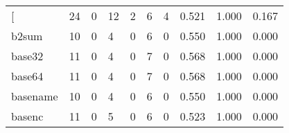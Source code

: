 \begin{longtable}{lp{1.3cm}p{1.3cm}p{1.3cm}p{1.3cm}p{1.3cm}p{1.3cm}p{1.3cm}p{1.3cm}p{1.3cm}}
\bottomrule
\endlastfoot
{[}         &                     24 &                                             0 &                                           12 &                                           2 &                                            6 &                                          4 &                                0.521 &                                  1.000 &                                0.167 \\
b2sum     &                     10 &                                             0 &                                            4 &                                           0 &                                            6 &                                          0 &                                0.550 &                                  1.000 &                                0.000 \\
base32    &                     11 &                                             0 &                                            4 &                                           0 &                                            7 &                                          0 &                                0.568 &                                  1.000 &                                0.000 \\
base64    &                     11 &                                             0 &                                            4 &                                           0 &                                            7 &                                          0 &                                0.568 &                                  1.000 &                                0.000 \\
basename  &                     10 &                                             0 &                                            4 &                                           0 &                                            6 &                                          0 &                                0.550 &                                  1.000 &                                0.000 \\
basenc    &                     11 &                                             0 &                                            5 &                                           0 &                                            6 &                                          0 &                                0.523 &                                  1.000 &                                0.000 \\

\end{longtable}
